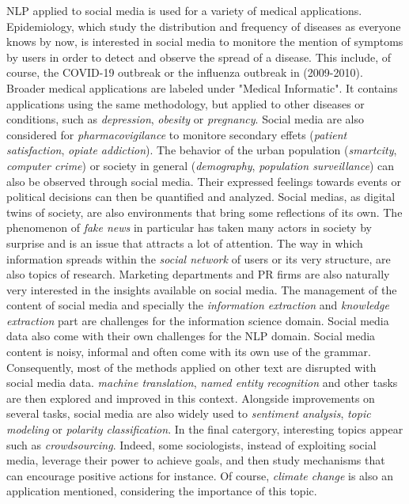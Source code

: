 NLP applied to social media is used for a variety of medical applications.
Epidemiology, which study the distribution and frequency of diseases as everyone knows by now,
is interested in social media to monitore the mention of symptoms by users in order to detect and observe the spread of a disease.
This include, of course, the COVID-19 outbreak or the influenza outbreak in (2009-2010).
Broader medical applications are labeled under "Medical Informatic".
It contains applications using the same methodology, but applied to other diseases or conditions, such as \emph{depression}, \emph{obesity} or \emph{pregnancy}.
Social media are also considered for \emph{pharmacovigilance} to monitore secondary effets (\emph{patient satisfaction}, \emph{opiate addiction}).
The behavior of the urban population (\emph{smartcity}, \emph{computer crime}) or society in general (\emph{demography}, \emph{population surveillance}) can also be observed through social media.
Their expressed feelings towards events or political decisions can then be quantified and analyzed.
Social medias, as digital twins of society, are also environments that bring some reflections of its own.
The phenomenon of \emph{fake news} in particular has taken many actors in society by surprise and is an issue that attracts a lot of attention.
The way in which information spreads within the \emph{social network} of users or its very structure, are also topics of research.
Marketing departments and PR firms are also naturally very interested in the insights available on social media.
The management of the content of social media and specially the \emph{information extraction} and \emph{knowledge extraction} part
are challenges for the information science domain.
Social media data also come with their own challenges for the NLP domain.
Social media content is noisy, informal and often come with its own use of the grammar.
Consequently, most of the methods applied on other text are disrupted with social media data.
\emph{machine translation}, \emph{named entity recognition} and other tasks are then explored and improved in this context.
Alongside improvements on several tasks, social media are also widely used to \emph{sentiment analysis}, \emph{topic modeling} or \emph{polarity classification}.
In the final catergory, interesting topics appear such as \emph{crowdsourcing}.
Indeed, some sociologists, instead of exploiting social media, leverage their power to achieve goals, and then study mechanisms that can encourage positive actions for instance.
Of course, \emph{climate change} is also an application mentioned, considering the importance of this topic.

